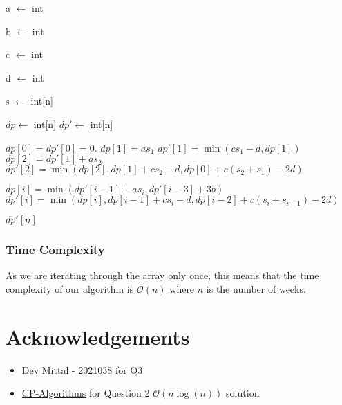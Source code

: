\documentclass[12pt]{article}
\begin{document}
\begin{algorithm}
    \begin{algorithmic}
        \Require a $\leftarrow$ int 

        \Require b $\leftarrow$ int 

        \Require c $\leftarrow$ int 

        \Require d $\leftarrow$ int 

        \Require s $\leftarrow$ int[n] 

        \State $dp \leftarrow$ int[n]
        \State $dp' \leftarrow$ int[n]


        \State $dp[0] = dp'[0] = 0$.
        \State $dp[1] = a s_1$
        \State $dp'[1] = \min(c s_1 - d, dp[1])$
        \State $dp[2] = dp'[1] + a s_2$
        \State $dp'[2] = \min(dp[2], dp[1] + c s_2 - d, dp[0] + c(s_2 + s_1) - 2 d)$

        \State $dp[i] = \min(dp'[i-1] + a s_i, dp'[i-3] + 3b)$
        \State $dp'[i] = \min(dp[i], dp[i-1] + c s_i - d, dp[i-2] + c(s_i + s_{i-1}) - 2 d)$

        \EndFor

        \Return $dp'[n]$



    \end{algorithmic}
\end{algorithm}

\pagebreak

\subsubsection{Time Complexity}

As we are iterating through the array only once, this means that the time complexity of our algorithm is $\mathcal{O}(n)$ where $n$ is the number of weeks.


\section{Acknowledgements}

\begin{itemize}
    \item Dev Mittal - 2021038 for Q3
    \item \href{https://cp-algorithms.com/sequences/longest_increasing_subsequence.html#solution-in-on-log-n-with-dynamic-programming-and-binary-search}{CP-Algorithms} for Question 2 $\mathcal{O}(n\log(n))$ solution
\end{itemize}
\end{document}
